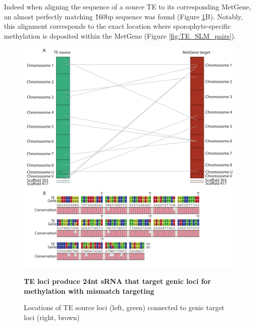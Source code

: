 Indeed when aligning the sequence of a source TE to its corresponding MetGene, an almost perfectly matching \~160bp sequence was found (Figure \ref{fig:SLM_targeting}B). Notably, this alignment corresponds to the exact location where sporophyte-specific methylation is deposited within the MetGene (Figure \ref{fig:TE_SLM_pairs}).

\begin{figure}[htbp!] 
\centering    
    \includegraphics[width=1\textwidth]{Chapter3/Figs/Figure5_SLM_source_target.pdf}
\caption{\textbf{TE loci produce 24nt sRNA that target genic loci for methylation with mismatch targeting}}
\label{fig:SLM_targeting}
\captionsetup{font=small}
    \caption*{Locations of TE source loci (left, green) connected to genic target loci (right, brown)}
\end{figure}

